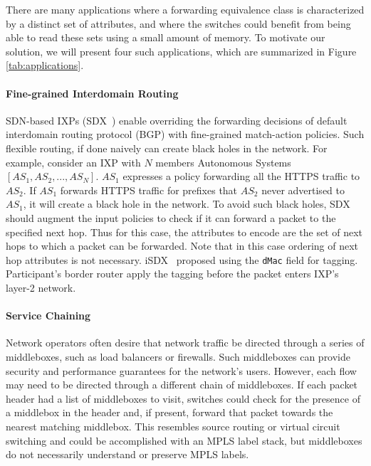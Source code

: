 There are many applications where a forwarding equivalence class is
characterized by a distinct set of attributes, and where the switches could
benefit from being able to read these sets using a small amount of memory. To
motivate our solution, we will present four such applications, which are
summarized in Figure \ref{tab:applications}.
 
\paragraph{Fine-grained Interdomain Routing} SDN-based IXPs 
(SDX~\cite{sdx, isdx}) enable overriding the forwarding decisions of default 
interdomain routing protocol (BGP) with fine-grained match-action policies. 
Such flexible routing, if done naively can create black holes in the network. 
For example, consider an IXP with $N$ members Autonomous Systems $[AS_1, 
AS_2,..., AS_N]$. $AS_1$ expresses a policy forwarding all the HTTPS traffic 
to $AS_2$. If $AS_1$ forwards HTTPS traffic for prefixes that $AS_2$ never 
advertised to $AS_1$, it will create a black hole in the network. To avoid 
such black holes, SDX should augment the input policies to check if it can 
forward a packet to the specified next hop. Thus for this case, the attributes 
to encode are the set of next hops to which a packet can be forwarded. Note 
that in this case ordering of next hop attributes is not necessary. 
iSDX~\cite{isdx} proposed using the {\tt dMac} field for tagging. 
Participant's border router apply the tagging before the packet enters 
IXP's layer-2 network.

\paragraph{Service Chaining} Network operators often desire that network traffic
be directed through a series of middleboxes, such as load balancers or
firewalls. Such middleboxes can provide security and performance guarantees for
the network's users.  However, each flow may need to be directed through a
different chain of middleboxes. If each packet header had a list of middleboxes
to visit, switches could check for the presence of a middlebox in the header
and, if present, forward that packet towards the nearest matching middlebox.
This resembles source routing or virtual circuit switching and could be
accomplished with an MPLS label stack, but middleboxes do not necessarily
understand or preserve MPLS labels. 

